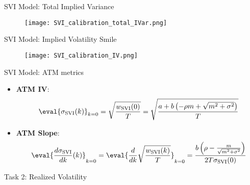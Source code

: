 \documentclass[xe, 12pt]{beamer}
\begin{document}
\begin{frame}{SVI Model: Total Implied Variance}
\begin{figure}
\centering
\texttt{[image: SVI\_calibration\_total\_IVar.png]}
\end{figure}
\end{frame}

\begin{frame}{SVI Model: Implied Volatility Smile}
\begin{figure}
\centering
\texttt{[image: SVI\_calibration\_IV.png]}
\end{figure}
\end{frame}

\begin{frame}{SVI Model: ATM metrics}
\begin{itemize}
\item
\textbf{ATM IV}:
\[
\eval{\sigma_{\text{SVI}}(k)}_{k=0} = \sqrt{\frac{w_{\text{SVI}}(0)}{T}} = \sqrt{ \frac{a + b \left( -\rho m + \sqrt{m^2 + \sigma^2} \right) }{T} }
\]

\item
\textbf{ATM Slope}:
\[
\eval{\frac{d\sigma_{\text{SVI}}}{dk}(k)}_{k=0} = \eval{\frac{d}{dk} \sqrt{\frac{w_{\text{SVI}}(k)}{T}}}_{k=0}
= \frac{b \left( \rho - \frac{m}{\sqrt{m^2 + \sigma^2}} \right)}{2 T \sigma_{\text{SVI}}(0)}
\]
\end{itemize}
\end{frame}

\begin{frame}
\begin{center}
\Large \textsf{Task 2: Realized Volatility}
\end{center}
\end{frame}

\begin{frame}
\end{frame}
\end{document}
